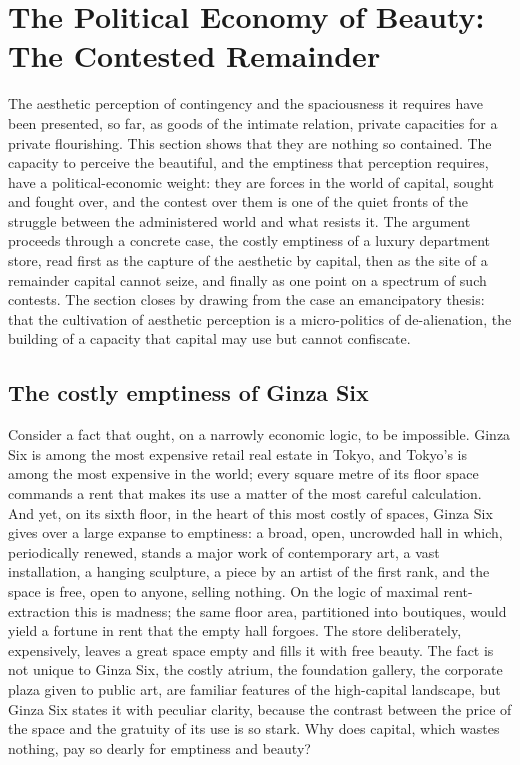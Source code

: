 \section{The Political Economy of Beauty: The Contested Remainder}
\label{p21:sec:pe-beauty}

\noindent
The aesthetic perception of contingency and the spaciousness it requires have been presented, so far, as goods of the intimate relation, private capacities for a private flourishing. This section shows that they are nothing so contained. The capacity to perceive the beautiful, and the emptiness that perception requires, have a political-economic weight: they are forces in the world of capital, sought and fought over, and the contest over them is one of the quiet fronts of the struggle between the administered world and what resists it. The argument proceeds through a concrete case, the costly emptiness of a luxury department store, read first as the capture of the aesthetic by capital, then as the site of a remainder capital cannot seize, and finally as one point on a spectrum of such contests. The section closes by drawing from the case an emancipatory thesis: that the cultivation of aesthetic perception is a micro-politics of de-alienation, the building of a capacity that capital may use but cannot confiscate.

\subsection{The costly emptiness of Ginza Six}
\label{p21:sub:pe-gsix}

Consider a fact that ought, on a narrowly economic logic, to be impossible. Ginza Six is among the most expensive retail real estate in Tokyo, and Tokyo's is among the most expensive in the world; every square metre of its floor space commands a rent that makes its use a matter of the most careful calculation. And yet, on its sixth floor, in the heart of this most costly of spaces, Ginza Six gives over a large expanse to emptiness: a broad, open, uncrowded hall in which, periodically renewed, stands a major work of contemporary art, a vast installation, a hanging sculpture, a piece by an artist of the first rank, and the space is free, open to anyone, selling nothing. On the logic of maximal rent-extraction this is madness; the same floor area, partitioned into boutiques, would yield a fortune in rent that the empty hall forgoes. The store deliberately, expensively, leaves a great space empty and fills it with free beauty. The fact is not unique to Ginza Six, the costly atrium, the foundation gallery, the corporate plaza given to public art, are familiar features of the high-capital landscape, but Ginza Six states it with peculiar clarity, because the contrast between the price of the space and the gratuity of its use is so stark. Why does capital, which wastes nothing, pay so dearly for emptiness and beauty?

